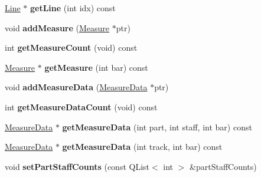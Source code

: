 \begin{DoxyCompactItemize}
\item 
\mbox{\label{class_o_v_e_1_1_ove_song_ae22f646ce1e103c0b8b9325503a3c91c}} 
\hyperlink{class_o_v_e_1_1_line}{Line} $\ast$ {\bfseries get\+Line} (int idx) const
\item 
\mbox{\label{class_o_v_e_1_1_ove_song_a4323e2945f9d97ac6d0f0011317dbf22}} 
void {\bfseries add\+Measure} (\hyperlink{class_o_v_e_1_1_measure}{Measure} $\ast$ptr)
\item 
\mbox{\label{class_o_v_e_1_1_ove_song_a1f73fc11852caf7876c52e8fd6112803}} 
int {\bfseries get\+Measure\+Count} (void) const
\item 
\mbox{\label{class_o_v_e_1_1_ove_song_a86ce557c25d08f40f94e4903b7b4cb88}} 
\hyperlink{class_o_v_e_1_1_measure}{Measure} $\ast$ {\bfseries get\+Measure} (int bar) const
\item 
\mbox{\label{class_o_v_e_1_1_ove_song_afa24e69ac83d36a3403df2bccf90a898}} 
void {\bfseries add\+Measure\+Data} (\hyperlink{class_o_v_e_1_1_measure_data}{Measure\+Data} $\ast$ptr)
\item 
\mbox{\label{class_o_v_e_1_1_ove_song_a839fb8271f9e62d5e893f2adceaf33b3}} 
int {\bfseries get\+Measure\+Data\+Count} (void) const
\item 
\mbox{\label{class_o_v_e_1_1_ove_song_a30d5b543e59a640997de210c2843cfdd}} 
\hyperlink{class_o_v_e_1_1_measure_data}{Measure\+Data} $\ast$ {\bfseries get\+Measure\+Data} (int part, int staff, int bar) const
\item 
\mbox{\label{class_o_v_e_1_1_ove_song_a8d33221fccfb19699082b706d479abe2}} 
\hyperlink{class_o_v_e_1_1_measure_data}{Measure\+Data} $\ast$ {\bfseries get\+Measure\+Data} (int track, int bar) const
\item 
\mbox{\label{class_o_v_e_1_1_ove_song_afa520db82fa017a01662d1b91ecef8ec}} 
void {\bfseries set\+Part\+Staff\+Counts} (const Q\+List$<$ int $>$ \&part\+Staff\+Counts)
\item 

\end{DoxyCompactItemize}
